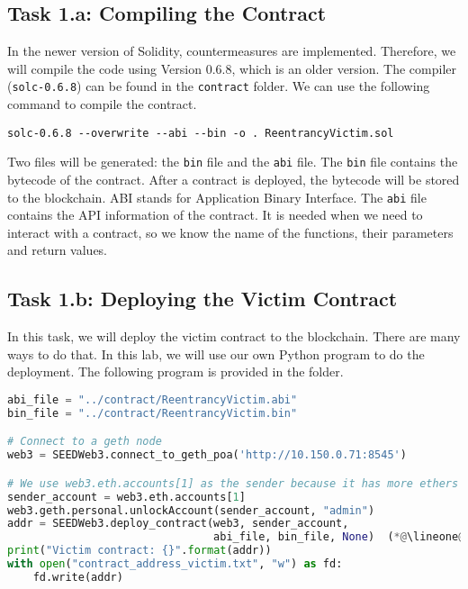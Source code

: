 \subsection{Task 1.a: Compiling the Contract} 

In the newer version of Solidity, countermeasures are implemented.
Therefore, we will compile the code using Version 0.6.8, which 
is an older version. The compiler (\texttt{solc-0.6.8}) can be found in the 
\texttt{contract} folder. We can use the following command to 
compile the contract. 

\begin{lstlisting}
solc-0.6.8 --overwrite --abi --bin -o . ReentrancyVictim.sol
\end{lstlisting}
 
Two files will be generated: the \texttt{bin} file and the \texttt{abi} file.   
The \texttt{bin} file contains the bytecode of the contract. After 
a contract is deployed, the bytecode will be stored to the blockchain.
ABI stands for Application Binary Interface. The \texttt{abi} file contains 
the API information of the contract. It is needed when we need to 
interact with a contract, so we know the name of the functions,
their parameters and return values. 



\subsection{Task 1.b: Deploying the Victim Contract} 

In this task, we will deploy the victim contract to the 
blockchain. There are many ways to do that. In this lab, 
we will use our own Python program to do the deployment.
The following program is provided in the 
folder. 

\begin{lstlisting}[language=python, 
    caption={Deploying the victim contract (\texttt{deploy\_victim\_contrac.py})}]
abi_file = "../contract/ReentrancyVictim.abi"
bin_file = "../contract/ReentrancyVictim.bin"

# Connect to a geth node
web3 = SEEDWeb3.connect_to_geth_poa('http://10.150.0.71:8545')

# We use web3.eth.accounts[1] as the sender because it has more ethers
sender_account = web3.eth.accounts[1]
web3.geth.personal.unlockAccount(sender_account, "admin")
addr = SEEDWeb3.deploy_contract(web3, sender_account,
                                abi_file, bin_file, None)  (*@\lineone@*) 
print("Victim contract: {}".format(addr))
with open("contract_address_victim.txt", "w") as fd:
    fd.write(addr)
\end{lstlisting}

